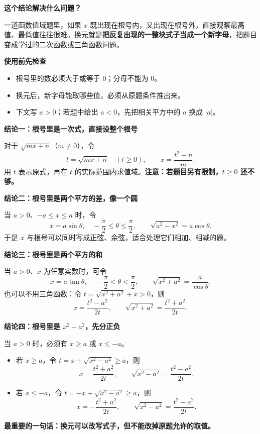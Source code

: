\begin{statementbox}
  \textbf{\textcolor{CStatement}{这个结论解决什么问题？}}

  一道函数值域题里，如果 $x$ 既出现在根号内，又出现在根号外，直接观察最高值、最低值往往很难。换元就是\textbf{把反复出现的一整块式子当成一个新字母}，把题目变成学过的二次函数或三角函数问题。

  \medskip
  \begin{center}\end{center}
\end{statementbox}
\clearpage
\begin{statementbox}
\textbf{\textcolor{CStatement}{使用前先检查}}
  \begin{itemize}[leftmargin=*,itemsep=0.35em]
    \item 根号里的数必须大于或等于 $0$；分母不能为 $0$。
    \item 换元后，新字母能取哪些值，必须从原题条件推出来。
    \item 下文写 $a>0$；若题中给出 $a<0$，先把相关平方中的 $a$ 换成 $|a|$。
  \end{itemize}

  \medskip
  \textbf{\textcolor{CStatement}{结论一：根号里是一次式，直接设整个根号}}

  对于 $\sqrt{mx+n}$（$m\ne0$），令
  \[
    t=\sqrt{mx+n}\quad(t\ge0),\qquad x=\frac{t^2-n}{m}.
  \]
  用 $t$ 表示原式，再在 $t$ 的实际范围内求值域。\textbf{注意：若题目另有限制，$t\ge0$ 还不够。}

  \medskip
  \textbf{\textcolor{CStatement}{结论二：根号里是两个平方的差，像一个圆}}

  当 $a>0$、$-a\le x\le a$ 时，令
  \[
    x=a\sin\theta,\quad -\frac{\pi}{2}\le\theta\le\frac{\pi}{2},
    \qquad\sqrt{a^2-x^2}=a\cos\theta.
  \]
  于是 $x$ 与根号可以同时写成正弦、余弦，适合处理它们相加、相减的题。

  \medskip
  \textbf{\textcolor{CStatement}{结论三：根号里是两个平方的和}}

  当 $a>0$、$x$ 为任意实数时，可令
  \[
    x=a\tan\theta,\quad-\frac{\pi}{2}<\theta<\frac{\pi}{2},
    \qquad \sqrt{x^2+a^2}=\frac{a}{\cos\theta}.
  \]
  也可以不用三角函数：令 $t=\sqrt{x^2+a^2}+x>0$，则
  \[
    x=\frac{t^2-a^2}{2t},\qquad
    \sqrt{x^2+a^2}=\frac{t^2+a^2}{2t}.
  \]

  \medskip
  \textbf{\textcolor{CStatement}{结论四：根号里是 $x^2-a^2$，先分正负}}

  当 $a>0$ 时，必须有 $x\ge a$ 或 $x\le-a$。
  \begin{itemize}[leftmargin=*,itemsep=0.35em]
    \item 若 $x\ge a$，令 $t=x+\sqrt{x^2-a^2}\ge a$，则
      \[
        x=\frac{t^2+a^2}{2t},\qquad
        \sqrt{x^2-a^2}=\frac{t^2-a^2}{2t}.
      \]
    \item 若 $x\le-a$，令 $t=-x+\sqrt{x^2-a^2}\ge a$，则
      \[
        x=-\frac{t^2+a^2}{2t},\qquad
        \sqrt{x^2-a^2}=\frac{t^2-a^2}{2t}.
      \]
  \end{itemize}

  \textbf{\textcolor{CStatement}{最重要的一句话：}}\textbf{换元可以改写式子，但不能改掉原题允许的取值。}
\end{statementbox}
